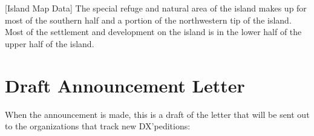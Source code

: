\documentclass[11pt]{article}
\begin{document}
\noindent%
\begin{minipage}{\linewidth}%
\captionsetup{width=0.8\linewidth}
[Island Map Data]{ The special refuge and natural
area of the island makes up for most of the southern half and a portion
of the northwestern tip of the island.   Most of the settlement
and development on the island is in the lower half of the upper half
of the island.}
\label{geol3}
\end{minipage}
\vskip5mm

\section{Draft Announcement Letter}

When the announcement is made, this is a draft of the 
letter that will be sent out to the organizations
that track new DX'peditions:
\par
\end{document}
